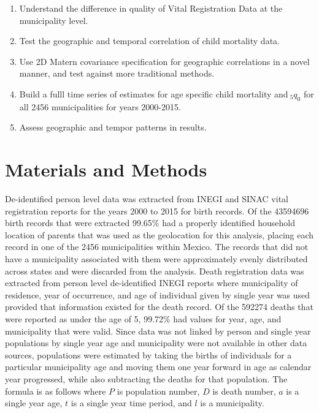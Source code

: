 \documentclass[a0,portrait]{a0poster}
\begin{document}
\begin{multicols}{2}
\begin{enumerate}
\item Understand the difference in quality of Vital Registration Data at the municipality level.
\item Test the geographic and temporal correlation of child mortality data.
\item Use 2D Matern covariance specification for geographic correlations in a novel manner, and test against more traditional methods.
\item Build a fulll time series of estimates for age specific child mortality and$~_{5}q_{0}$ for all 2456 municipalities for years 2000-2015.
\item Assess geographic and tempor patterns in results.
\end{enumerate}


\section*{Materials and Methods}

De-identified person level data was extracted from INEGI and SINAC vital registration reports for the years 2000 to 2015 for birth records. Of the 43594696 birth records that were extracted 99.65\% had a properly identified household location of parents that was used as the geolocation for this analysis, placing each record in one of the 2456 municipalities within Mexico. The records that did not have a municipality associated with them were approximately evenly distributed across states and were discarded from the analysis. Death registration data was extracted from person level de-identified INEGI reports where municipality of residence, year of occurrence, and age of individual given by single year was used provided that information existed for the death record. Of the 592274 deaths that were reported as under the age of 5, 99.72\% had values for year, age, and municipality that were valid. Since data was not linked by person and single year populations by single year age and municipality were not available in other data sources, populations were estimated by taking the births of individuals for a particular municipality age and moving them one year forward in age as calendar year progressed, while also subtracting the deaths for that population. The formula is as follows where $P$ is population number, $D$ is death number, $a$ is a single year age, $t$ is a single year time period, and $l$ is a municipality.


\end{multicols}
\end{document}
